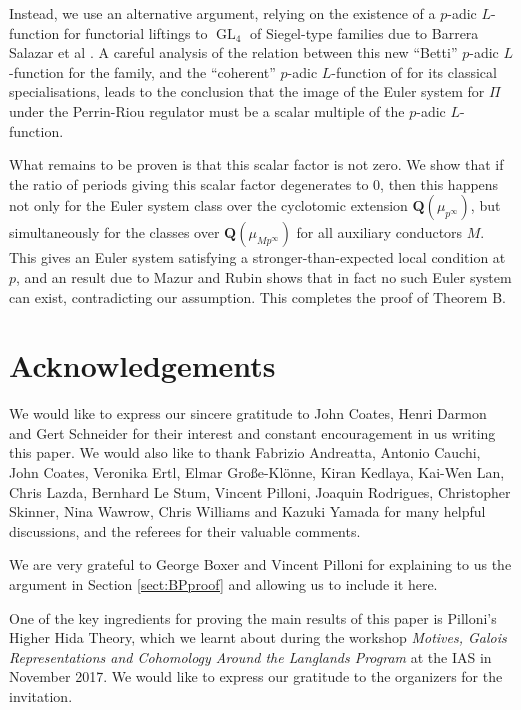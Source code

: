 \documentclass[cjm]{ipart}
\theoremstyle{plain}
\theoremstyle{remark}
\DeclareMathOperator{\GL}{GL}
\newcommand{\QQ}{\mathbf{Q}}
\numberwithin{equation}{subsection}
\begin{document}
  Instead, we use an alternative argument, relying on the existence of a $p$-adic $L$-function for functorial liftings to $\GL_4$ of Siegel-type families due to Barrera Salazar et al \cite{BDGJW25}. A careful analysis of the relation between this new ``Betti'' $p$-adic $L$-function for the family, and the ``coherent'' $p$-adic $L$-function of \cite{LPSZ1} for its classical specialisations, leads to the conclusion that the image of the Euler system for $\Pi$ under the Perrin-Riou regulator must be a scalar multiple of the $p$-adic $L$-function.

  What remains to be proven is that this scalar factor is not zero. We show that if the ratio of periods giving this scalar factor degenerates to 0, then this happens not only for the Euler system class over the cyclotomic extension $\QQ(\mu_{p^\infty})$, but simultaneously for the classes over $\QQ(\mu_{Mp^\infty})$ for all auxiliary conductors $M$. This gives an Euler system satisfying a stronger-than-expected local condition at $p$, and an result due to Mazur and Rubin shows that in fact no such Euler system can exist, contradicting our assumption. This completes the proof of Theorem B.



\section{Acknowledgements}

 We would like to express our sincere gratitude to John Coates, Henri Darmon and Gert Schneider for their interest and constant encouragement in us writing this paper. We would also like to thank Fabrizio Andreatta, Antonio Cauchi, John Coates, Veronika Ertl, Elmar Gro{\ss}e-Kl\"onne, Kiran Kedlaya, Kai-Wen Lan, Chris Lazda, Bernhard Le Stum, Vincent Pilloni, Joaquin Rodrigues, Christopher Skinner, Nina Wawrow, Chris Williams and Kazuki Yamada for many helpful discussions, and the referees for their valuable comments.

 We are very grateful to George Boxer and Vincent Pilloni for explaining to us the argument in Section \ref{sect:BPproof} and allowing us to include it here.

 One of the key ingredients for proving the main results of this paper is Pilloni's Higher Hida Theory, which we learnt about during the workshop \emph{Motives, Galois Representations and Cohomology Around the Langlands Program} at the IAS in November 2017. We would like to express our gratitude to the organizers for the invitation.
\end{document}
